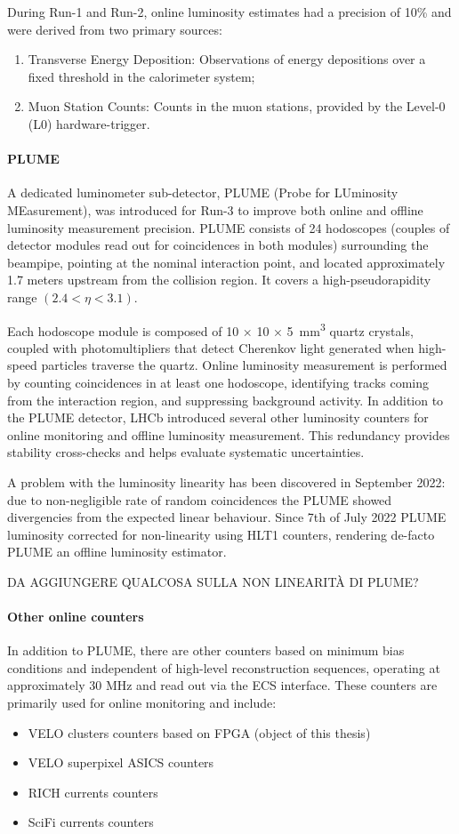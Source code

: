 During Run-1 and Run-2, online luminosity estimates had a precision of 10\% and were derived from two primary sources: 
\begin{enumerate}
    \item Transverse Energy Deposition: Observations of energy depositions over a fixed threshold in the calorimeter system;
    \item Muon Station Counts: Counts in the muon stations, provided by the Level-0 (L0) hardware-trigger.
\end{enumerate}
\paragraph{PLUME}
A dedicated luminometer sub-detector, PLUME (Probe for LUminosity MEasurement), was introduced for Run-3 to improve both online and offline luminosity measurement precision. PLUME consists of 24 hodoscopes (couples of detector modules read out for coincidences in both modules) surrounding the beampipe, pointing at the nominal interaction point, and located approximately 1.7 meters upstream from the collision region. It covers a high-pseudorapidity range $(2.4 < \eta < 3.1)$.

Each hodoscope module is composed of 10 × 10 × \SI{5}{\milli\meter\tothe{3}} quartz crystals, coupled with photomultipliers that detect Cherenkov light generated when high-speed particles traverse the quartz. Online luminosity measurement is performed by counting coincidences in at least one hodoscope, identifying tracks coming from the interaction region, and suppressing background activity.
In addition to the PLUME detector, LHCb introduced several other luminosity counters for online monitoring and offline luminosity measurement. This redundancy provides stability cross-checks and helps evaluate systematic uncertainties.

A problem with the luminosity linearity has been discovered in September 2022: due to non-negligible rate of random coincidences the PLUME showed divergencies from the expected linear behaviour. Since 7th of July 2022 PLUME luminosity corrected for non-linearity using HLT1 counters, rendering de-facto PLUME an offline luminosity estimator.

DA AGGIUNGERE QUALCOSA SULLA NON LINEARITÀ DI PLUME?

\paragraph{Other online counters} 
In addition to PLUME, there are other counters based on minimum bias conditions and independent of high-level reconstruction sequences, operating at approximately 30 MHz and read out via the ECS interface. These counters are primarily used for online monitoring and include:
\begin{itemize}
   \item VELO clusters counters based on FPGA (object of this thesis)
   \item VELO superpixel ASICS counters
   \item RICH currents counters
   \item SciFi currents counters
\end{itemize}
